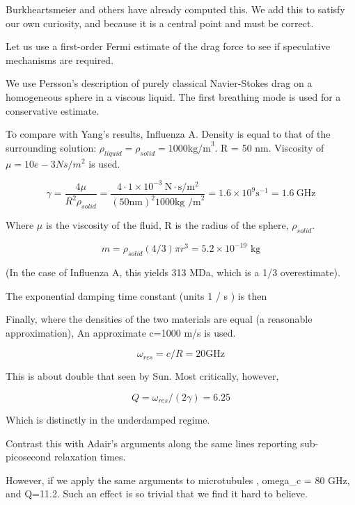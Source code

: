 \documentclass[paper.tex]{subfiles}
\begin{document}
\begin{autem}
	Burkheartsmeier and others have already computed this. We add this to satisfy our own curiosity, and because it is a central point and must be correct.
\end{autem}


Let us use a first-order Fermi estimate of the drag force to see if speculative mechanisms are required.

We use Persson's description of purely classical Navier-Stokes drag \cite{nature1986} on a homogeneous sphere in a viscous liquid. The first breathing mode is used for a conservative estimate.

To compare with Yang's results, Influenza A. Density is equal to that of the surrounding solution: $\rho_{liquid} = \rho_{solid} = 1000 \text{kg/m}^3$. R = 50 nm. Viscosity of $\mu=10e-3 Ns/m^2$ is used.

$$ \gamma = \frac{4\mu}{R^2 \rho_{solid}} = \frac{4 \cdot 1\times 10^{-3}\  \text{N}\cdot \text{s} / \text{m}^2 }{(50 \text{nm})^2 1000 \text{kg /m}^2} = 1.6 \times 10^9 \text{s}^{-1} = 1.6\ \text{GHz}$$

Where $\mu$ is the viscosity of the fluid, R is the radius of the sphere, $\rho_{solid}$. \footnotemark \footnotemark



$$m = \rho_{solid}  (4/3) \pi r^3 = 5.2 \times 10^{-19} \text{ kg} $$

(In the case of Influenza A, this yields 313 MDa, which is a 1/3 overestimate). 

The exponential damping time constant (units 1 / s ) is then

Finally, where the densities of the two materials are equal (a reasonable approximation), An approximate c=1000 m/s is used. 

$$ \omega_{res} = c / R = 20 \text{GHz}$$

This is about double that seen by Sun. Most critically, however,

$$ Q = \omega_{res}/(2\gamma) = 6.25 $$

Which is distinctly in the underdamped regime.

Contrast this with Adair's arguments along the same lines reporting sub-picosecond relaxation times.

However, if we apply the same arguments to microtubules \cite{Viscous2000}, omega_c = 80 GHz, and Q=11.2. Such an effect is so trivial that we find it hard to believe.
\end{document}
